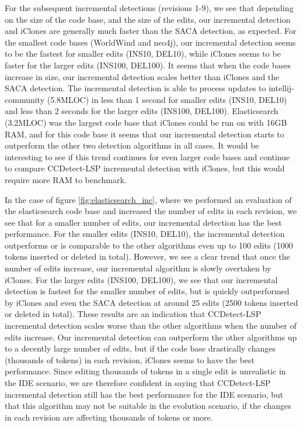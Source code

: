 For the subsequent incremental detections (revisions 1-9), we see that depending on the
size of the code base, and the size of the edits, our incremental detection and iClones
are generally much faster than the SACA detection, as expected. For the smallest code
bases (WorldWind and neo4j), our incremental detection seems to be the fastest for smaller
edits (INS10, DEL10), while iClones seems to be faster for the larger edits (INS100,
DEL100). It seems that when the code bases increase in size, our incremental detection
scales better than iClones and the SACA detection. The incremental detection is able to
process updates to intellij-community (5.8MLOC) in less than 1 second for smaller edits
(INS10, DEL10) and less than 2 seconds for the larger edits (INS100, DEL100).
Elasticsearch (3.2MLOC) was the largest code base that iClones could be run on with 16GB
RAM, and for this code base it seems that our incremental detection starts to outperform
the other two detection algorithms in all cases. It would be interesting to see if this
trend continues for even larger code bases and continue to compare CCDetect-LSP
incremental detection with iClones, but this would require more RAM to benchmark. 

In the case of figure \ref{fig:elasticsearch_inc}, where we performed an evaluation of the
elasticsearch code base and increased the number of edits in each revision, we see that
for a smaller number of edits, our incremental detection has the best performance. For the
smaller edits (INS10, DEL10), the incremental detection outperforms or is comparable to
the other algorithms even up to 100 edits (1000 tokens inserted or deleted in total).
However, we see a clear trend that once the number of edits increase, our incremental
algorithm is slowly overtaken by iClones. For the larger edits (INS100, DEL100), we see
that our incremental detection is fastest for the smaller number of edits, but is quickly
outperformed by iClones and even the SACA detection at around 25 edits (2500 tokens
inserted or deleted in total). These results are an indication that CCDetect-LSP
incremental detection scales worse than the other algorithms when the number of edits
increase. Our incremental detection can outperform the other algorithms up to a decently
large number of edits, but if the code base drastically changes (thousands of tokens) in
each revision, iClones seems to have the best performance. Since editing thousands of
tokens in a single edit is unrealistic in the IDE scenario, we are therefore confident in
saying that CCDetect-LSP incremental detection still has the best performance for the IDE
scenario, but that this algorithm may not be suitable in the evolution scenario, if the
changes in each revision are affecting thousands of tokens or more.

